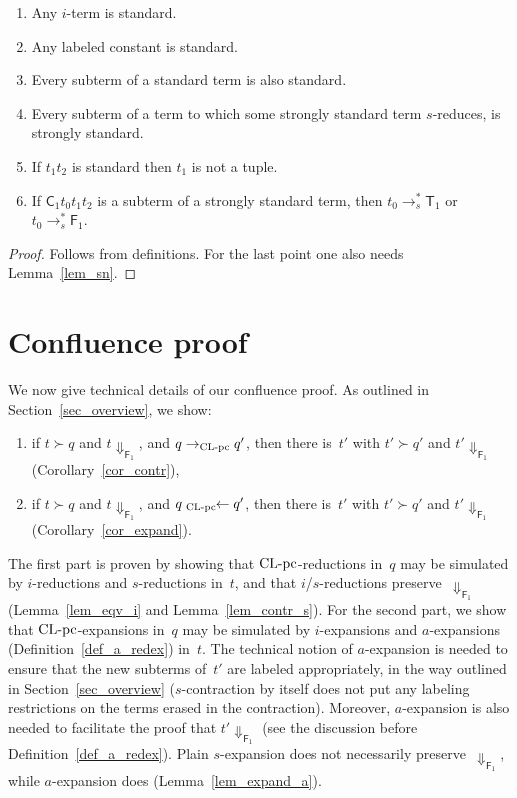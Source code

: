 \documentclass[a4paper,UKenglish]{lipics-v2016}
\newcommand{\Cs}{\mathsf{C}}
\newcommand{\Fs}{\mathsf{F}}
\newcommand{\Ts}{\mathsf{T}}
\newcommand{\from}{\ensuremath{\leftarrow}}
\newcommand{\Da}{\ensuremath{\Downarrow}}
\newcommand{\leftidx}[3]{{\;\vphantom{#2}}#1\!\!#2#3}
\newcommand{\CLCz}{{\mbox{$\text{\rm CL-pc}$}}}
\newcommand{\sCLCz}{\ensuremath{\text{\rm CL-pc}}}
\begin{document}
\begin{lemma}\label{lem_standard_properties}
  \begin{enumerate}
  \item Any $i$-term is standard.
  \item Any labeled constant is standard.
  \item Every subterm of a standard term is also standard.
  \item Every subterm of a term to which some strongly standard term
    $s$-reduces, is strongly standard.
  \item If $t_1 t_2$ is standard then $t_1$ is not a tuple.
  \item\label{prop_std_c_1} If $\Cs_1 t_0 t_1 t_2$ is a subterm of a
    strongly standard term, then $t_0 \to_s^* \Ts_1$ or
    $t_0 \to_s^* \Fs_1$.
  \end{enumerate}
\end{lemma}

\begin{proof}
  Follows from definitions. For the last point one also needs
  Lemma~\ref{lem_sn}.
\end{proof}

\section{Confluence proof}\label{sec_proof}

We now give technical details of our confluence proof. As outlined in
Section~\ref{sec_overview}, we show:
\begin{enumerate}
\item if $t \succ q$ and $t \Da_{\Fs_1}$, and $q \to_{\sCLCz} q'$,
  then there is~$t'$ with $t' \succ q'$ and $t' \Da_{\Fs_1}$
  (Corollary~\ref{cor_contr}),
\item if $t \succ q$ and $t \Da_{\Fs_1}$, and
  $q \leftidx{{}_{\sCLCz}}{\from} q'$, then there is~$t'$ with
  $t' \succ q'$ and $t' \Da_{\Fs_1}$ (Corollary~\ref{cor_expand}).
\end{enumerate}
The first part is proven by showing that $\CLCz$-reductions in~$q$ may
be simulated by $i$-reductions and $s$-reductions in~$t$, and that
$i$/$s$-reductions preserve~$\Da_{\Fs_1}$ (Lemma~\ref{lem_eqv_i} and
Lemma~\ref{lem_contr_s}). For the second part, we show that
$\CLCz$-expansions in~$q$ may be simulated by $i$-expansions and
$a$-expansions (Definition~\ref{def_a_redex}) in~$t$. The technical
notion of $a$-expansion is needed to ensure that the new subterms
of~$t'$ are labeled appropriately, in the way outlined in
Section~\ref{sec_overview} ($s$-contraction by itself does not put any
labeling restrictions on the terms erased in the
contraction). Moreover, $a$-expansion is also needed to facilitate the
proof that $t'\Da_{\Fs_1}$ (see the discussion before
Definition~\ref{def_a_redex}). Plain $s$-expansion does not
necessarily preserve~$\Da_{\Fs_1}$, while $a$-expansion does
(Lemma~\ref{lem_expand_a}).
\end{document}
